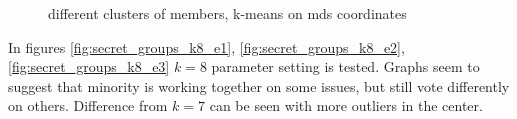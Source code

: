 \documentclass[a4paper,12pt]{article}
\begin{document}
\begin{figure}[!tbp]
		\hfill
		\caption{different clusters of members, \gls{k-means} on \acrshort{mds} coordinates}
	\end{figure}
	
	\clearpage
	
	In figures \ref{fig:secret_groups_k8_e1},  \ref{fig:secret_groups_k8_e2}, \ref{fig:secret_groups_k8_e3} $k=8$ parameter setting is tested. Graphs seem to suggest that minority is working together on some issues, but still vote differently on others. Difference from $k=7$ can be seen with more outliers in the center.
	
\end{document}
